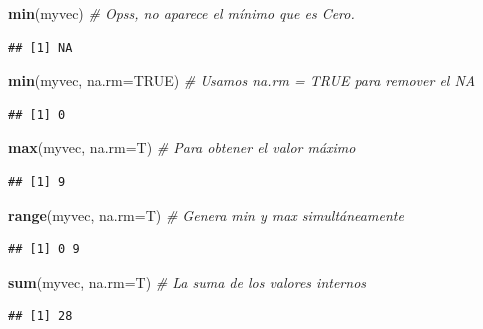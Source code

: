 \documentclass[10pt,]{krantz}
\makeatletter
\newenvironment{Shaded}{\begin{snugshade}}{\end{snugshade}}
\newcommand{\KeywordTok}[1]{\textcolor[rgb]{0.13,0.29,0.53}{\textbf{{#1}}}}
\newcommand{\DataTypeTok}[1]{\textcolor[rgb]{0.13,0.29,0.53}{{#1}}}
\newcommand{\CommentTok}[1]{\textcolor[rgb]{0.56,0.35,0.01}{\textit{{#1}}}}
\newcommand{\OtherTok}[1]{\textcolor[rgb]{0.56,0.35,0.01}{{#1}}}
\newcommand{\NormalTok}[1]{{#1}}
\newenvironment{kframe}{%
\medskip{}
\setlength{\fboxsep}{.8em}
 \def\at@end@of@kframe{}%
 \ifinner\ifhmode%
  \def\at@end@of@kframe{\end{minipage}}%
  \begin{minipage}{\columnwidth}%
 \fi\fi%
 \def\FrameCommand##1{\hskip\@totalleftmargin \hskip-\fboxsep
 \colorbox{shadecolor}{##1}\hskip-\fboxsep
     \hskip-\linewidth \hskip-\@totalleftmargin \hskip\columnwidth}%
 \MakeFramed {\advance\hsize-\width
   \@totalleftmargin\z@ \linewidth\hsize
   \@setminipage}}%
 {\par\unskip\endMakeFramed%
 \at@end@of@kframe}
\renewenvironment{Shaded}{\begin{kframe}}{\end{kframe}}
\makeatother
\begin{document}
\begin{Shaded}
\begin{Highlighting}[]
\KeywordTok{min}\NormalTok{(myvec)  }\CommentTok{# Opss, no aparece el mínimo que es Cero.}
\end{Highlighting}
\end{Shaded}

\begin{verbatim}
## [1] NA
\end{verbatim}

\begin{Shaded}
\begin{Highlighting}[]
\KeywordTok{min}\NormalTok{(myvec, }\DataTypeTok{na.rm=}\OtherTok{TRUE}\NormalTok{)  }\CommentTok{# Usamos na.rm = TRUE para remover el NA}
\end{Highlighting}
\end{Shaded}

\begin{verbatim}
## [1] 0
\end{verbatim}

\begin{Shaded}
\begin{Highlighting}[]
\KeywordTok{max}\NormalTok{(myvec, }\DataTypeTok{na.rm=}\NormalTok{T)  }\CommentTok{# Para obtener el valor máximo}
\end{Highlighting}
\end{Shaded}

\begin{verbatim}
## [1] 9
\end{verbatim}

\begin{Shaded}
\begin{Highlighting}[]
\KeywordTok{range}\NormalTok{(myvec, }\DataTypeTok{na.rm=}\NormalTok{T)  }\CommentTok{# Genera min y max simultáneamente}
\end{Highlighting}
\end{Shaded}

\begin{verbatim}
## [1] 0 9
\end{verbatim}

\begin{Shaded}
\begin{Highlighting}[]
\KeywordTok{sum}\NormalTok{(myvec, }\DataTypeTok{na.rm=}\NormalTok{T)  }\CommentTok{# La suma de los valores internos}
\end{Highlighting}
\end{Shaded}

\begin{verbatim}
## [1] 28
\end{verbatim}
\end{document}
